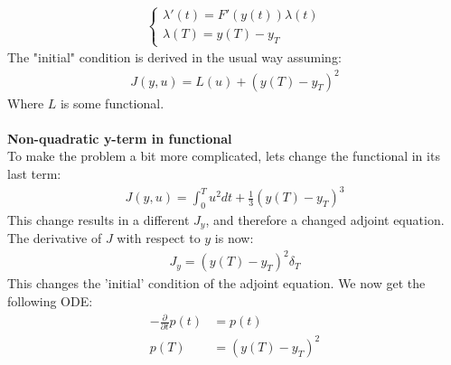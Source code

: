 \documentclass[11pt,a4paper]{report}
\begin{document}
\begin{align*}
\left\{
     \begin{array}{lr}
       	\lambda'(t)=F'(y(t))\lambda(t)\\
       	   \lambda(T)= y(T)-y_T
     \end{array}
   \right.
\end{align*}
The "initial" condition is derived in the usual way assuming: 
\begin{align*}
J(y,u)=L(u) + (y(T)-y_T)^2
\end{align*}
Where $L$ is some functional.
\\
\\
\textbf{Non-quadratic y-term in functional}
\\
To make the problem a bit more complicated, lets change the functional in its last term:
\begin{align*}
J(y,u) = \int_0^T u^2 dt + \frac{1}{3}(y(T)-y_T)^3
\end{align*}
This change results in a different $J_y$, and therefore a changed adjoint equation. The derivative of $J$ with respect to $y$ is now:
\begin{align*}
J_y = (y(T)-y_T)^2\delta_T
\end{align*}
This changes the 'initial' condition of the adjoint equation. We now get the following ODE:
\begin{align*}
-\frac{\partial }{\partial t}p(t) &=p(t)  \\
p(T) &= (y(T)-y_T)^2
\end{align*}
\end{document}
